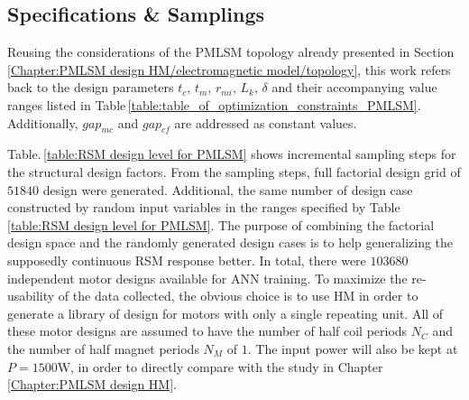         
        \subsection{Specifications \& Samplings}    \label{Chapter:RSM/PMLSM/spec}
        
        
            Reusing the considerations of the \acs{PMLSM} topology already presented in Section\,\ref{Chapter:PMLSM design HM/electromagnetic model/topology}, this work refers back to the design parameters $t_c$, $t_m$, $r_{mi}$, $L_k$, $\delta$ and their accompanying value ranges listed in Table\,\ref{table:table_of_optimization_constraints_PMLSM}. Additionally, $gap_{mc}$ and $gap_{cf}$ are addressed as constant values. 
            
            
            Table.\,\ref{table:RSM design level for PMLSM} shows incremental sampling steps for the structural design factors. From the sampling steps, full factorial design grid of $51840$ design were generated. Additional, the same number of design case constructed by random input variables in the ranges specified by Table\,\ref{table:RSM design level for PMLSM}. The purpose of combining the factorial design space and the randomly generated design cases is to help generalizing the supposedly continuous \acs{RSM} response better. In total, there were $103680$ independent motor designs available for \acs{ANN} training. To maximize the re-usability of the data collected, the obvious choice is to use \acs{HM} in order to generate a library of design for motors with only a single repeating unit. All of these motor designs are assumed to have the number of half coil periods $N_C$ and the number of half magnet periods $N_M$ of $1$. The input power will also be kept at $P=1500\mathrm{W}$, in order to directly compare with the study in Chapter\,\ref{Chapter:PMLSM design HM}.
            

